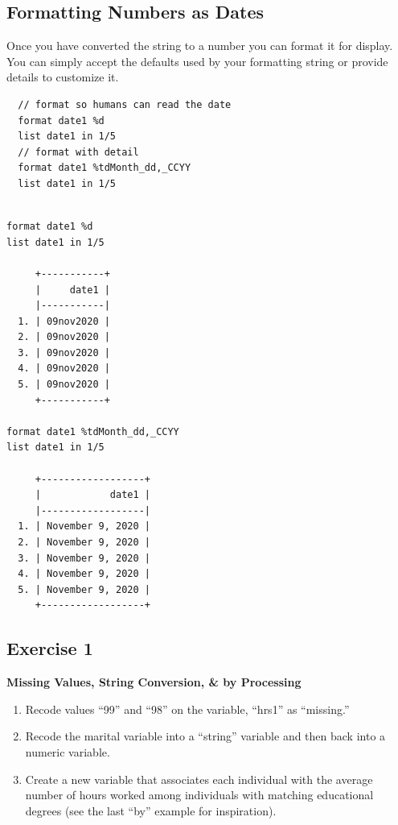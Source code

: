\documentclass[]{book}
\providecommand{\tightlist}{%
  \setlength{\itemsep}{0pt}\setlength{\parskip}{0pt}}
\begin{document}
\subsection{Formatting Numbers as
Dates}\label{formatting-numbers-as-dates}

Once you have converted the string to a number you can format it for
display. You can simply accept the defaults used by your formatting
string or provide details to customize it.

\begin{verbatim}
  // format so humans can read the date
  format date1 %d
  list date1 in 1/5
  // format with detail
  format date1 %tdMonth_dd,_CCYY
  list date1 in 1/5
\end{verbatim}

\begin{verbatim}

format date1 %d
list date1 in 1/5

     +-----------+
     |     date1 |
     |-----------|
  1. | 09nov2020 |
  2. | 09nov2020 |
  3. | 09nov2020 |
  4. | 09nov2020 |
  5. | 09nov2020 |
     +-----------+

format date1 %tdMonth_dd,_CCYY
list date1 in 1/5

     +------------------+
     |            date1 |
     |------------------|
  1. | November 9, 2020 |
  2. | November 9, 2020 |
  3. | November 9, 2020 |
  4. | November 9, 2020 |
  5. | November 9, 2020 |
     +------------------+
\end{verbatim}

\subsection{Exercise 1}\label{exercise-1-7}

\textbf{Missing Values, String Conversion, \& by Processing}

\begin{enumerate}
\def\labelenumi{\arabic{enumi}.}
\tightlist
\item
  Recode values ``99'' and ``98'' on the variable, ``hrs1'' as
  ``missing.''
\item
  Recode the marital variable into a ``string'' variable and then back
  into a numeric variable.
\item
  Create a new variable that associates each individual with the average
  number of hours worked among individuals with matching educational
  degrees (see the last ``by'' example for inspiration).
\end{enumerate}
\end{document}
